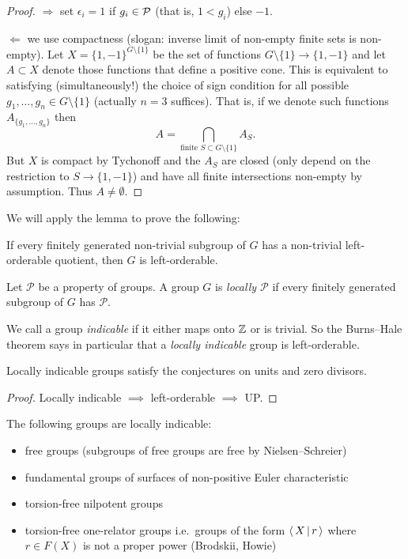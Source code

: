 \begin{proof}
    $\Rightarrow$ set $\epsilon_i = 1$ if $g_i \in \mathcal{P}$ (that is, $1 < g_i$) else $-1$.

    $\Leftarrow$ we use compactness (slogan: inverse limit of non-empty finite sets is non-empty).
    Let $X = \{1, -1\}^{G \setminus \{1\}}$ be the set of functions $G \setminus \{1\} \to \{1, -1\}$ and let $A \subset X$ denote those functions that define a positive cone.
    This is equivalent to satisfying (simultaneously!) the choice of sign condition for all possible $g_1, \dots, g_n \in G \setminus \{1\}$ (actually $n = 3$ suffices).
    That is, if we denote such functions $A_{\{g_1, \dots, g_n\}}$ then \[
        A = \bigcap_{\text{finite } S \subset G \setminus \{1\}} A_S.
    \]
    But $X$ is compact by Tychonoff and the $A_S$ are closed (only depend on the restriction to $S \to \{1, -1\}$) and have all finite intersections non-empty by assumption.
    Thus $A \neq \emptyset$.
\end{proof}

We will apply the lemma to prove the following:
\begin{theorem}
    If every finitely generated non-trivial subgroup of $G$ has a non-trivial left-orderable quotient, then $G$ is left-orderable.
\end{theorem}

\begin{definition}
    Let $\mathcal{P}$ be a property of groups.
    A group $G$ is \emph{locally $\mathcal{P}$} if every finitely generated subgroup of $G$ has $\mathcal{P}$.
\end{definition}

We call a group \emph{indicable} if it either maps onto $\mathbb{Z}$ or is trivial.
So the Burns--Hale theorem says in particular that a \emph{locally indicable} group is left-orderable.

\begin{corollary}[Higman, 1940]
    \label{corollary:LI_kaplansky}
    Locally indicable groups satisfy the conjectures on units and zero divisors.
\end{corollary}

\begin{proof}
    Locally indicable $\implies$ left-orderable $\implies$ UP.
\end{proof}

\begin{example}
    The following groups are locally indicable:
    \begin{itemize}
        \item free groups (subgroups of free groups are free by Nielsen--Schreier)
        \item fundamental groups of surfaces of non-positive Euler characteristic
        \item torsion-free nilpotent groups
        \item torsion-free one-relator groups i.e.\ groups of the form $\langle \, X \, | \, r \, \rangle$ where $r \in F(X)$ is not a proper power (Brodskii, Howie)
    \end{itemize}
\end{example}

